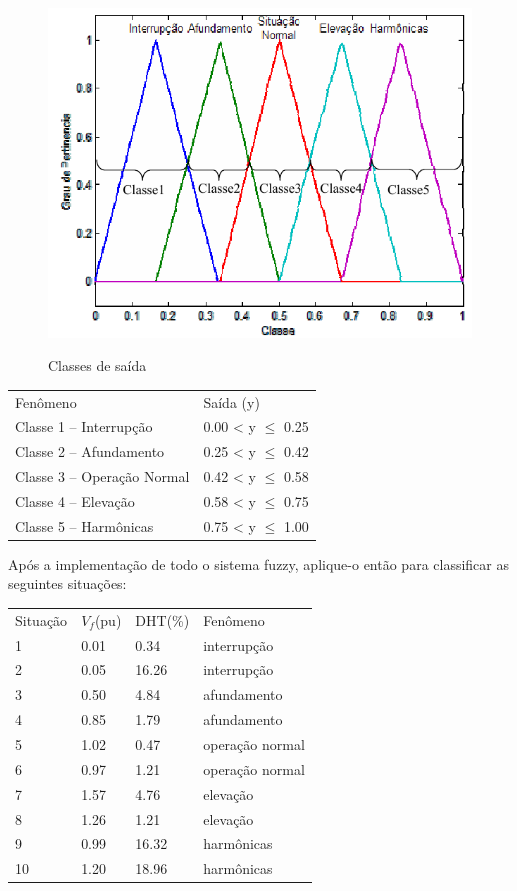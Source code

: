 \documentclass{report}
\begin{document}
\begin{figure}[hptb]
\centering
\includegraphics[scale=.6]{classe.png}
\label{esquematico}
\caption{Classes de saída}
\end{figure}


\begin{center}
\begin{tabular}{ll}
Fenômeno & Saída (y)\\
Classe 1 – Interrupção & 0.00 < y $\leq$ 0.25 \\
Classe 2 – Afundamento & 0.25 < y $\leq$ 0.42 \\
Classe 3 – Operação Normal & 0.42 < y $\leq$ 0.58 \\
Classe 4 – Elevação & 0.58 < y $\leq$ 0.75 \\
Classe 5 – Harmônicas & 0.75 < y $\leq$ 1.00
\end{tabular}
\end{center}




Após a implementação de todo o sistema fuzzy, aplique-o então para classificar as
seguintes situações:


\begin{center}
\begin{tabular}{llll}
Situação & $V_f$(pu) & DHT(\%) & Fenômeno \\
1 & 0.01 & 0.34 & interrupção\\
2 & 0.05 & 16.26 & interrupção\\
3 & 0.50 & 4.84 & afundamento\\
4 & 0.85 & 1.79 & afundamento\\
5 & 1.02 & 0.47 & operação normal\\
6 & 0.97 & 1.21 & operação normal\\
7 & 1.57 & 4.76 & elevação\\
8 & 1.26 & 1.21 & elevação\\
9 & 0.99 & 16.32 & harmônicas\\
10 & 1.20 & 18.96 & harmônicas\\
\end{tabular}
\end{center}


\newpage
\lstset{basicstyle=\footnotesize}

\end{document}
